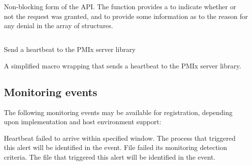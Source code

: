 
\optattrend

\descr

Non-blocking form of the  \ac{API}. The  function provides a  to indicate whether or not the request was granted, and to provide some information as to the reason for any denial in the  array of  structures.

\subsection{}

\summary

Send a heartbeat to the \ac{PMIx} server library

\format



\descr

A simplified macro wrapping  that sends a heartbeat to the \ac{PMIx} server library.

\subsection{Monitoring events}
\label{api:struct:events:monitor}

The following monitoring events may be available for registration, depending upon implementation and host environment support:

\begin{constantdesc}
%
Heartbeat failed to arrive within specified window. The process that triggered this alert will be identified in the event.
%
File failed its monitoring detection criteria. The file that triggered this alert will be identified in the event.
%
\end{constantdesc}

